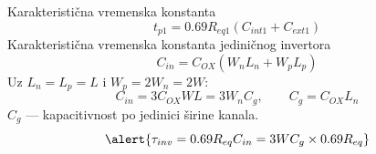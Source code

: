 \begin{frame}[label=09_3-s036]{Karakteristična vremenska konstanta}
\[t_{p1}=0.69R_{eq1}(C_{int1}+C_{ext1})\]
\alert{Karakteristična vremenska konstanta jediničnog invertora}
\[C_{in}=C_{OX}(W_nL_n+W_pL_p)\]
Uz $L_n=L_p=L$ i $W_p=2W_n=2W$:
\[C_{in}=3C_{OX}WL=3W_nC_g,\qquad C_g=C_{OX}L_n\]
$C_g$ — kapacitivnost po jedinici širine kanala.
\[\alert{\tau_{inv}=0.69R_{eq}C_{in}=3WC_g\times0.69R_{eq}}\]
\end{frame}

